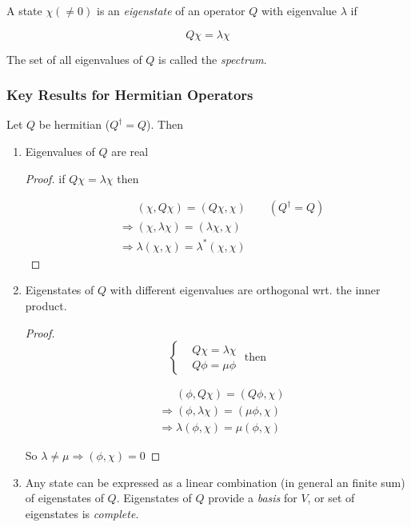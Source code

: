 \documentclass[a4paper]{article}
\begin{document}
A state $ \chi (\neq 0 )$ is an \emph{eigenstate} of an operator $ Q $ with eigenvalue $ \lambda $ if

\[ Q \chi = \lambda \chi \]

The set of all eigenvalues of $ Q $ is called the \emph{spectrum}.

\subsubsection{Key Results for Hermitian Operators}

Let $ Q $ be hermitian ($ Q^{\dag} = Q $). Then

\begin{enumerate}
	\item Eigenvalues of $ Q $ are real
	
	\begin{proof}
		if $ Q \chi = \lambda \chi $ then
		
		\begin{align*}
		& \quad \; \; (\chi, Q \chi) = (Q \chi, \chi) \qquad (Q^{\dag} = Q) \\
		& \Rightarrow (\chi, \lambda \chi) = (\lambda \chi, \chi) \\
		& \Rightarrow \lambda(\chi,\chi) = \lambda^{*} (\chi,\chi)
		\end{align*}
	\end{proof}


	\item Eigenstates of $ Q $ with different eigenvalues are orthogonal wrt. the inner product. 
	
	\begin{proof}
		\[ \begin{cases}   & Q \chi = \lambda \chi \\ & Q \phi = \mu \phi  \end{cases} \text{ then} \]
		
			\begin{align*}
		& \quad \; \; (\phi, Q \chi) = (Q \phi, \chi)  \\
		& \Rightarrow (\phi, \lambda \chi) = (\mu  \phi, \chi) \\
		& \Rightarrow \lambda(\phi,\chi) = \mu (\phi,\chi)
		\end{align*}
		
		So $ \lambda \neq \mu \Rightarrow (\phi, \chi) = 0 $
		
	\end{proof}

	\item Any state can be expressed as a linear combination (in general an finite sum) of eigenstates of $ Q $.
	Eigenstates of $ Q $ provide a \emph{basis} for $ V $, or set of eigenstates is \emph{complete}.
	
\end{enumerate}
\end{document}
